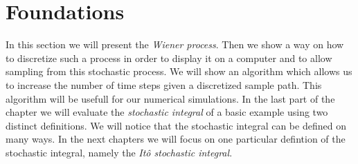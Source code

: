 
\chapter{Foundations}
\label{ch:Foundations}
In this section we will present the \emph{Wiener process}. Then we show a way on how to discretize such a process in order to display it on a computer and to allow sampling from this stochastic process. 
We will show an algorithm which allows us to increase the number of time steps given a discretized sample path. This algorithm will be usefull for our numerical simulations.
In the last part of the chapter we will evaluate the \emph{stochastic integral} of a basic example using two distinct definitions. We will notice that the stochastic integral can be defined on many ways. In the next chapters we will focus on one particular defintion of the stochastic integral, namely the \emph{It\^o stochastic integral}.
